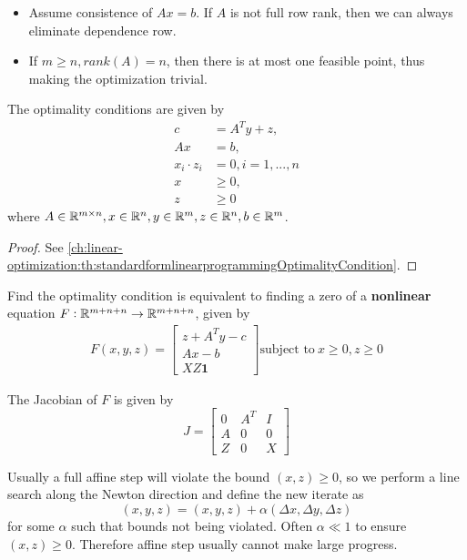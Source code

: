 \begin{refsection}
\begin{remark}[Why requires $m\leq n$ and $rank(A) = m$]\hfill
\begin{itemize}
	\item Assume consistence of $Ax = b$. If $A$ is not full row rank, then we can always eliminate dependence row.
	\item If $m\geq n, rank(A) = n$, then there is at most one feasible point, thus making the optimization trivial.
\end{itemize} 
\end{remark}

\begin{lemma}\cite[359]{nocedal2006numerical}
The optimality conditions are given by
\begin{align*}
c &= A^Ty + z,\\
Ax &= b,\\
x_i\cdot z_i &= 0, i=1,...,n \\
x &\geq 0,\\ 
z &\geq 0
\end{align*}
where $A\in \mathbb{R}^{m\times n}, x\in \mathbb{R}^n, y\in \mathbb{R}^m, z\in \mathbb{R}^n, b\in \mathbb{R}^m$.
\end{lemma}
\begin{proof}
See  \autoref{ch:linear-optimization:th:standardformlinearprogrammingOptimalityCondition}.
\end{proof}


\begin{note}
Find the optimality condition is equivalent to finding a zero of a \textbf{nonlinear} equation $F:\mathbb{R}^{m+n+n} \to \mathbb{R}^{m+n+n}$, given by
\begin{align*}
F(x,y,z) = 
\begin{bmatrix}
z + A^Ty - c \\
Ax -  b\\
XZ\bm{1} 
\end{bmatrix}
\text{subject to} ~ x \geq 0, z\geq 0
\end{align*}

The Jacobian of $F$ is given by
$$ J =  
\begin{bmatrix}
0 & A^T & I \\
A & 0 & 0 \\
Z & 0 & X
\end{bmatrix}
$$
\end{note}
\begin{remark}
Usually a full affine step will violate the bound $(x,z)\geq 0$, so we perform a line search along the Newton direction and define the new iterate as
$$(x,y,z) = (x,y,z) + \alpha(\Delta x, \Delta y, \Delta z)$$
for some $\alpha$ such that bounds not being violated. Often $\alpha \ll 1$ to ensure $(x,z)\geq 0$. Therefore affine step usually cannot make large progress.  
\end{remark}



\end{refsection}
